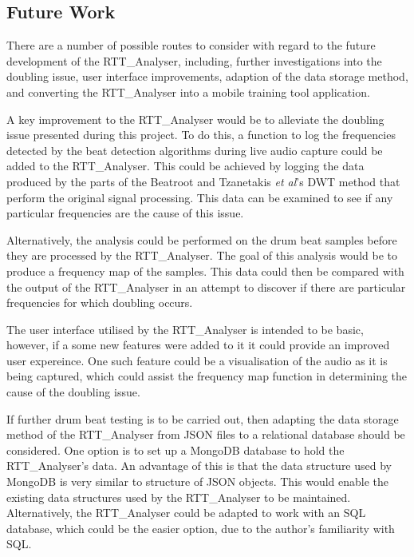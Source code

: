 \documentclass[a4paper, 11pt]{article}
\begin{document}
\subsection{Future Work}
There are a number of possible routes to consider with regard to the future development of the RTT\_Analyser, including, further investigations into the doubling issue, user interface improvements, adaption of the data storage method, and converting the RTT\_Analyser into a mobile training tool application.\par

A key improvement to the RTT\_Analyser would be to alleviate the doubling issue presented during this project. To do this, a function to log the frequencies detected by the beat detection algorithms during live audio capture could be added to the RTT\_Analyser. This could be achieved by logging the data produced by the parts of the Beatroot and Tzanetakis \textit{et al}'s \cite{tzane1} DWT method that perform the original signal processing. This data can be examined to see if any particular frequencies are the cause of this issue.\par

Alternatively, the analysis could be performed on the drum beat samples before they are processed by the RTT\_Analyser. The goal of this analysis would be to produce a frequency map of the samples. This data could then be compared with the output of the RTT\_Analyser in an attempt to discover if there are particular frequencies for which doubling occurs.\par

The user interface utilised by the RTT\_Analyser is intended to be basic, however, if a some new features were added to it it could provide an improved user expereince. One such feature could be a visualisation of the audio as it is being captured, which could assist the frequency map function in determining the cause of the doubling issue.

If further drum beat testing is to be carried out, then adapting the data storage method of the RTT\_Analyser from JSON files to a relational database should be considered. One option is to set up a MongoDB\cite{mongo} database to hold the RTT\_Analyser's data. An advantage of this is that the data structure used by MongoDB is very similar to structure of JSON objects. This would enable the existing data structures used by the RTT\_Analyser to be maintained. Alternatively, the RTT\_Analyser could be adapted to work with an SQL database, which could be the easier option, due to the author's familiarity with SQL.\par  
\end{document}
